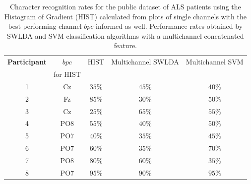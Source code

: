 \documentclass[utf8]{frontiersSCNS} %
\begin{document}
\begin{table}[htb]
\caption{Character recognition rates for the public dataset of ALS patients using the Histogram of Gradient (HIST) calculated from plots of single channels with the best performing channel $bpc$ informed as well.   Performance rates obtained by SWLDA and SVM classification algorithms with a multichannel concatenated feature.}
\centering
\begin{tabular}{c|cc|c|c}
\toprule
\textbf{Participant}	&  $bpc$	&  HIST & Multichannel SWLDA & Multichannel SVM \\
                                    &  for HIST        &           &                                       &   \\
\midrule
1     &     Cz   &   $35\%$  & $45\%$  & $40\%$\\
2     &     Fz   &   $85\%$  & $30\%$   & $50\%$   \\
3     &     Cz   &   $25\%$  & $65\%$ & $55\%$   \\
4     &     PO8 &   $55\%$ & $40\%$  & $50\%$   \\
5     &     PO7 &   $40\%$ & $35\%$  & $45\%$   \\
6     &     PO7 &   $60\%$ &  $35\%$  & $70\%$   \\
7     &     PO8 &   $80\%$ & $60\%$   & $35\%$   \\
8     &     PO7 &   $95\%$  & $90\%$   & $95\%$  \\

\end{tabular}
\label{tab:resultsalsswlda}
\end{table}
\end{document}
